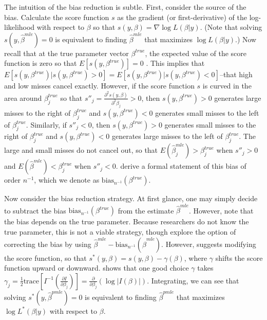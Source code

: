 \documentclass[12pt]{article}
\begin{document}
The intuition of the bias reduction is subtle. 
First, consider the source of the bias.
Calculate the score function $s$ as the gradient (or first-derivative) of the log-likelihood with respect to $\beta$ so that $s(y, \beta) = \nabla \log L(\beta | y)$. 
(Note that solving $s(y, \hat{\beta}^{mle}) = 0$ is equivalent to finding $\hat{\beta}^{mle}$ that maximizes $\log L(\beta | y)$.) 
Now recall that at the true parameter vector $\beta^{true}$, the expected value of the score function is zero so that $E\left[ s(y, \beta^{true})\right] = 0$ \citep[p. 517]{Greene2012}.
This implies that $E\left[ s(y, \beta^{true}) | s(y, \beta^{true}) > 0 \right] =  E\left[ s(y, \beta^{true}) | s(y, \beta^{true}) < 0 \right]$--that high and low misses cancel exactly.
However, if the score function $s$ is curved in the area around $\beta^{true}_j$ so that $s''_j = \frac{\partial^2 s(y, \beta)}{\partial^2 \beta_j} > 0$, then $s(y, \beta^{true}) > 0$ generates large misses to the right of $\beta^{true}_j$ and $s(y, \beta^{true}) < 0$ generates small misses to the left of $\beta^{true}_j$. 
Similarly, if $s''_j < 0$, then $s(y, \beta^{true}) > 0$ generates small misses to the right of $\beta^{true}_j$ and $s(y, \beta^{true}) < 0$ generates large misses to the left of $\beta^{true}_j$. 
The large and small misses do not cancel out, so that $E(\hat{\beta}^{mle}_j) > \beta^{true}_j$ when $s''_j > 0$ and $E(\hat{\beta}^{mle}) < \beta^{true}_j$ when $s''_j < 0$.
\citet[pp. 251-252]{CoxSnell1968} derive a formal statement of this bias of order $n^{-1}$, which we denote as $\text{bias}_{n^{-1}}(\beta^{true})$. 

Now consider the bias reduction strategy. 
At first glance, one may simply decide to subtract the bias $\text{bias}_{n^{-1}}(\beta^{true})$ from the estimate $\hat{\beta}^{mle}$. 
However, note that the bias depends on the true parameter. 
Because researchers do not know the true parameter, this is not a viable strategy, though \cite{AndersonRichardson1979} explore the option of correcting the bias by using  $\hat{\beta}^{mle} - \text{bias}_{n^{-1}}(\hat{\beta}^{mle})$.
However, \cite{Firth1993} suggests modifying the score function, so that $s^*(y, \beta) = s(y, \beta) - \gamma(\beta)$, where $\gamma$ shifts the score function upward or downward.
\cite{Firth1993} shows that one good choice $\gamma$ takes $\gamma_j = \frac{1}{2} \text{trace} \left[ I^{-1} \left( \frac{\partial I}{\partial \beta_j}\right)\right] = \frac{\partial}{\partial \beta_j} \left( \log | I(\beta) | \right)$.
Integrating, we can see that solving $s^*(y, \hat{\beta}^{pmle}) = 0$ is equivalent to finding $\hat{\beta}^{pmle}$ that maximizes $\log L^*(\beta | y)$ with respect to $\beta$.
\end{document}
